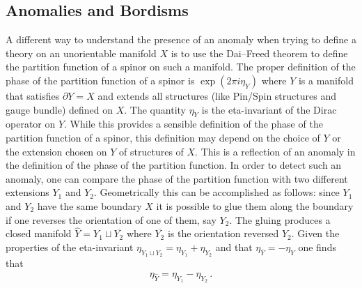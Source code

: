 \documentclass[12pt]{article}%
\numberwithin{equation}{section}
\newcommand{\al}[1]{\begin{align}#1\end{align}}
\renewcommand{\(}{\left(}
\renewcommand{\)}{\right)}
\renewcommand{\[}{\left[}
\renewcommand{\]}{\right]}
\begin{document}
\subsection{Anomalies and Bordisms}

A different way to understand the presence of an anomaly when trying to define a theory on an unorientable manifold $X$ is to use the Dai--Freed theorem \cite{Dai:1994kq} to define the partition function of a spinor on such a manifold. The proper definition of the phase of the partition function of a spinor is $\exp(2 \pi i \eta_Y)$ where $Y$ is a manifold that satisfies $\partial Y = X$ and extends all structures (like Pin/Spin structures and gauge bundle) defined on $X$. The quantity $\eta_Y$ is the eta-invariant of the Dirac operator on $Y$. While this provides a sensible definition of the phase of the partition function of a spinor, this definition may depend on the choice of $Y$ or the extension chosen on $Y$ of structures of $X$. This is a reflection of an anomaly in the definition of the phase of the partition function. In order to detect such an anomaly, one can compare the phase of the partition function with two different extensions $Y_1$ and $Y_2$. Geometrically this can be accomplished as follows: since $Y_1$ and $Y_2$ have the same boundary $X$ it is possible to glue them along the boundary if one reverses the orientation of one of them, say $Y_2$. The gluing produces a closed manifold $\hat Y = Y_1 \sqcup \overline{Y_2} $ where $\overline{Y_2}$ is the orientation reversed $Y_2$. Given the properties of the eta-invariant $\eta_{Y_1 \sqcup Y_2} = \eta_{Y_1} +\eta_{Y_2}$ and that $\eta_{\overline Y} = - \eta_Y$ one finds that
%
\al{ \eta_{\hat Y} = \eta_{Y_1} - \eta_{Y_2}\,.
}
%
\end{document}
